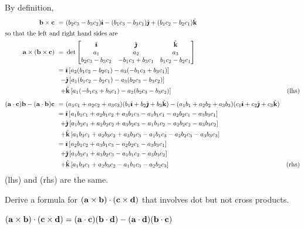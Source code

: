 \begin{solution}
By definition, 
\begin{align*}
\vb\times\vc
\ =\ &(b_2c_3-b_3c_2)\hi-(b_1c_3-b_3c_1)\hj
    +(b_1c_2-b_2c_1)\hk \\
\intertext{so that the left and right hand sides are}
\va\times(\vb\times\vc)
\ =\ &\det\left[\begin{matrix}\hi&\hj &\hk\\
                     a_1&a_2&a_3\\
            b_2c_3-b_3c_2&-b_1c_3+b_3c_1&b_1c_2-b_2c_1\end{matrix}\right]\\
\ =\ &\hi\,[a_2(b_1c_2-b_2c_1)-a_3(-b_1c_3+b_3c_1)]\\
{-}&\hj\,[a_1(b_1c_2-b_2c_1)-a_3(b_2c_3-b_3c_2)]\\
{+}&\hk\,[a_1(-b_1c_3+b_3c_1)-a_2(b_2c_3-b_3c_2)]&{\rm (lhs)}\\
\noalign{\vskip0.05in}
(\va\cdot\vc)\vb-(\va\cdot\vb)\vc
\ =\ &(a_1c_1+a_2c_2+a_3c_3)(b_1\hi+b_2\hj+b_3\hk)
-(a_1b_1+a_2b_2+a_3b_3)(c_1\hi+c_2\hj+c_3\hk)\\
{=}\ &
\hi\,[a_1b_1c_1+a_2b_1c_2+a_3b_1c_3-a_1b_1c_1-a_2b_2c_1-a_3b_3c_1]
\\
{+}&\hj\,[a_1b_2c_1+a_2b_2c_2+a_3b_2c_3-a_1b_1c_2-a_2b_2c_2-a_3b_3c_2]
\\
{+}&\hk\,[a_1b_3c_1+a_2b_3c_2+a_3b_3c_3-a_1b_1c_3-a_2b_2c_3-a_3b_3c_3]\cr
{=}\ &
\hi\,[a_2b_1c_2+a_3b_1c_3-a_2b_2c_1-a_3b_3c_1]
\\
{+}&\hj\,[a_1b_2c_1+a_3b_2c_3-a_1b_1c_2-a_3b_3c_2]
\\
{+}&\hk\,[a_1b_3c_1+a_2b_3c_2-a_1b_1c_3-a_2b_2c_3]
&{\rm (rhs)}
\end{align*}
(lhs) and (rhs) are the same.
\end{solution}


\begin{question}
Derive a formula for $(\mathbf{a}\times\mathbf{b})\cdot(\mathbf{c}\times\mathbf{d})$
that involves dot but not cross products.
\end{question}


\begin{answer}
$(\mathbf{a}\times\mathbf{b})\cdot(\mathbf{c}\times\mathbf{d})=
(\mathbf{a}\cdot\mathbf{c})(\mathbf{b}\cdot\mathbf{d})
-(\mathbf{a}\cdot\mathbf{d})(\mathbf{b}\cdot\mathbf{c})$
\end{answer}

